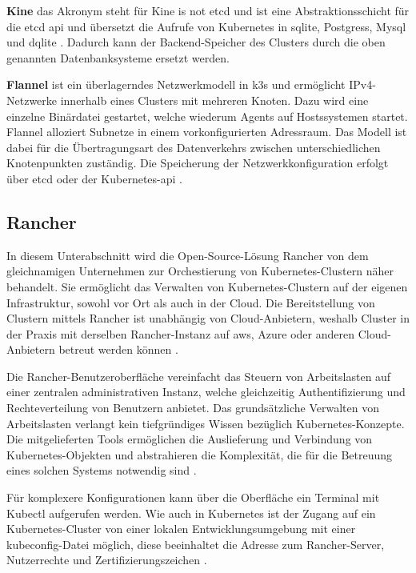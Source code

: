 \textbf{Kine}
das Akronym steht für \glqq Kine is not etcd\grqq{} und ist eine Abstraktionsschicht für die etcd \acs{api} und übersetzt die Aufrufe von Kubernetes in sqlite, Postgress, Mysql und dqlite \cite{k3sgit}.
Dadurch kann der Backend-Speicher des Clusters durch die oben genannten Datenbanksysteme ersetzt werden.

\textbf{Flannel}
ist ein überlagerndes Netzwerkmodell in k3s und ermöglicht IPv4-Netzwerke innerhalb eines Clusters mit mehreren Knoten.
Dazu wird eine einzelne Binärdatei gestartet, welche wiederum Agents auf Hostssystemen startet. Flannel alloziert Subnetze in einem vorkonfigurierten Adressraum.
Das Modell ist dabei für die Übertragungsart des Datenverkehrs zwischen unterschiedlichen Knotenpunkten zuständig.
Die Speicherung der Netzwerkkonfiguration erfolgt über etcd oder der Kubernetes-\acs{api} \cite{flannel}.


\subsection{Rancher}
In diesem Unterabschnitt wird die Open-Source-Lösung Rancher von dem gleichnamigen Unternehmen zur Orchestierung von Kubernetes-Clustern näher behandelt.
Sie ermöglicht das Verwalten von Kubernetes-Clustern auf der eigenen Infrastruktur, sowohl vor Ort als auch in der Cloud.
Die Bereitstellung von Clustern mittels Rancher ist unabhängig von Cloud-Anbietern, weshalb Cluster in der Praxis mit derselben Rancher-Instanz auf \acs{aws}, Azure oder anderen Cloud-Anbietern betreut werden können \cite{rancher}.

Die Rancher-Benutzeroberfläche vereinfacht das Steuern von Arbeitslasten auf einer zentralen administrativen Instanz, welche gleichzeitig Authentifizierung und Rechteverteilung von Benutzern anbietet.
Das grundsätzliche Verwalten von Arbeitslasten verlangt kein tiefgründiges Wissen bezüglich Kubernetes-Konzepte. 
Die mitgelieferten Tools ermöglichen die Auslieferung und Verbindung von Kubernetes-Objekten und abstrahieren die Komplexität, die für die Betreuung eines solchen Systems notwendig sind \cite{rancher,AzureKubernetesService}.

Für komplexere Konfigurationen kann über die Oberfläche ein Terminal mit Kubectl aufgerufen werden.
Wie auch in Kubernetes ist der Zugang auf ein Kubernetes-Cluster von einer lokalen Entwicklungsumgebung mit einer kubeconfig-Datei möglich, diese beeinhaltet die Adresse zum Rancher-Server, Nutzerrechte und Zertifizierungszeichen \cite{rancherKubeconfig}.

